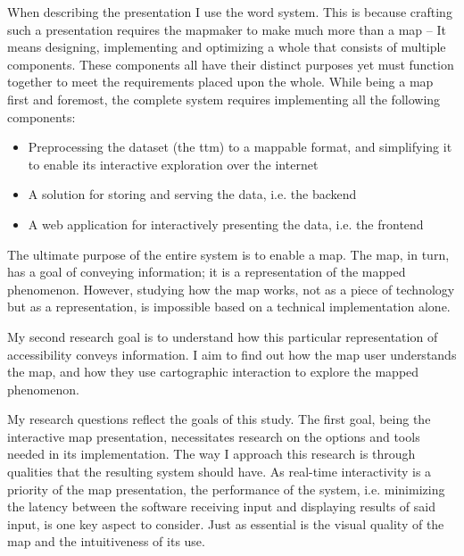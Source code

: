 When describing the presentation I use the word system.
This is because crafting such a presentation
requires the mapmaker to make much more than a map --
It means designing, implementing and optimizing
a whole that consists of multiple components.
These components all have their distinct purposes yet must function together
to meet the requirements placed upon the whole.
While being a map first and foremost, the complete system
requires implementing all the following components:
\begin{itemize}
	\item Preprocessing the dataset (the \acrshort{ttm}) to a mappable format,
	and simplifying it to enable its interactive exploration over the internet
	\item A solution for storing and serving the data, i.e. the backend
	\item A web application for interactively presenting the data, i.e. the frontend
\end{itemize}

The ultimate purpose of the entire system is to enable a map.
The map, in turn, has a goal of conveying information;
it is a representation of the mapped phenomenon.
However, studying how the map works,
not as a piece of technology but as a representation,
is impossible based on a technical implementation alone.

My second research goal is to understand how
this particular representation of accessibility conveys information.
I aim to find out how the map user understands the map,
and how they use cartographic interaction to explore the mapped phenomenon.


My research questions reflect the goals of this study.  %
The first goal, being the interactive map presentation,
necessitates research on the options and tools
needed in its implementation.
The way I approach this research is through qualities
that the resulting system should have.
As real-time interactivity is a priority of the map presentation,
the performance of the system,
i.e. minimizing the latency between
the software receiving input and displaying results of said input,
is one key aspect to consider.
Just as essential is the visual quality of the map
and the intuitiveness of its use.

